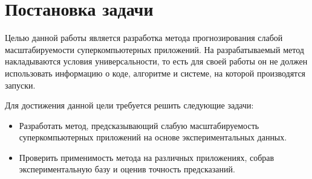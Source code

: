 \section{Постановка задачи}
	Целью данной работы является разработка метода прогнозирования слабой масштабируемости суперкомпьютерных приложений. На разрабатываемый метод накладываются условия универсальности, то есть для своей работы он не должен использовать информацию о коде, алгоритме и системе, на которой производятся запуски.

	Для достижения данной цели требуется решить следующие задачи:
	\begin{itemize}
		\item Разработать метод, предсказывающий слабую масштабируемость суперкомпьютерных приложений на основе экспериментальных данных.
		\item Проверить применимость метода на различных приложениях, собрав экспериментальную базу и оценив точность предсказаний.
	\end{itemize}


\clearpage
